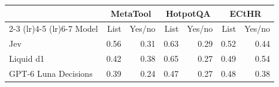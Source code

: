 \begin{tabular}{lrrrrrr}
\toprule
 & \multicolumn{2}{c}{MetaTool} & \multicolumn{2}{c}{HotpotQA} & \multicolumn{2}{c}{ECtHR} \\
\cmidrule(lr){2-3} \cmidrule(lr){4-5} \cmidrule(lr){6-7}
Model & List & Yes/no & List & Yes/no & List & Yes/no \\
\midrule
Jev & 0.56 & 0.31 & 0.63 & 0.29 & 0.52 & 0.44 \\
Liquid d1 & 0.42 & 0.38 & 0.65 & 0.27 & 0.49 & 0.54 \\
GPT-6 Luna Decisions & 0.39 & 0.24 & 0.47 & 0.27 & 0.48 & 0.38 \\
\bottomrule
\end{tabular}
